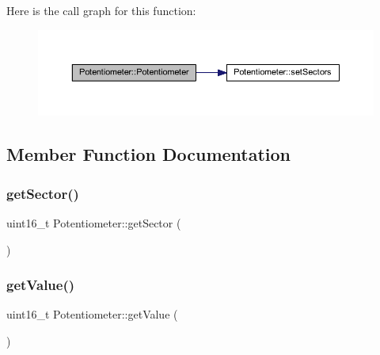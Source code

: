 Here is the call graph for this function\+:
\nopagebreak
\begin{figure}[H]
\begin{center}
\leavevmode
\includegraphics[width=350pt]{d3/d10/class_potentiometer_af91e2477f31efbb3b7ebfedb427007ff_cgraph}
\end{center}
\end{figure}


\subsection{Member Function Documentation}
\mbox{\label{class_potentiometer_a5dabb56ce200afabd7cdf9cd4d0d3305}} 
\subsubsection{\texorpdfstring{get\+Sector()}{getSector()}}
{\footnotesize\ttfamily uint16\+\_\+t Potentiometer\+::get\+Sector (\begin{DoxyParamCaption}{ }\end{DoxyParamCaption})}

\mbox{\label{class_potentiometer_ac992f846228fddede6d86d6ffa1be9b6}} 
\subsubsection{\texorpdfstring{get\+Value()}{getValue()}}
{\footnotesize\ttfamily uint16\+\_\+t Potentiometer\+::get\+Value (\begin{DoxyParamCaption}{ }\end{DoxyParamCaption})}

